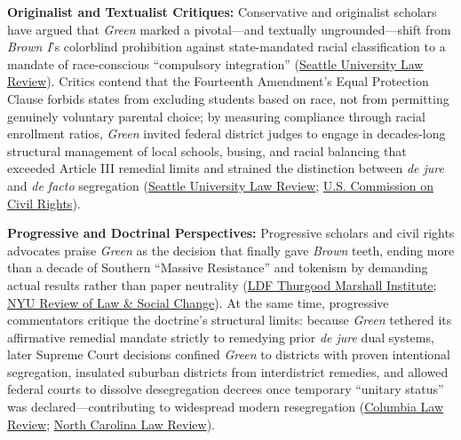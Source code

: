 \documentclass[12pt]{article}
\begin{document}
\textbf{Originalist and Textualist Critiques:} Conservative and originalist scholars have argued that \textit{Green} marked a pivotal---and textually ungrounded---shift from \textit{Brown I}'s colorblind prohibition against state-mandated racial classification to a mandate of race-conscious ``compulsory integration'' (\href{https://digitalcommons.law.seattleu.edu/cgi/viewcontent.cgi?article=1840&context=sulr}{Seattle University Law Review}). Critics contend that the Fourteenth Amendment's Equal Protection Clause forbids states from excluding students based on race, not from permitting genuinely voluntary parental choice; by measuring compliance through racial enrollment ratios, \textit{Green} invited federal district judges to engage in decades-long structural management of local schools, busing, and racial balancing that exceeded Article III remedial limits and strained the distinction between \textit{de jure} and \textit{de facto} segregation (\href{https://digitalcommons.law.seattleu.edu/cgi/viewcontent.cgi?article=1840&context=sulr}{Seattle University Law Review}; \href{https://www.usccr.gov/files/historical/2006/06-006.pdf}{U.S. Commission on Civil Rights}).

\textbf{Progressive and Doctrinal Perspectives:} Progressive scholars and civil rights advocates praise \textit{Green} as the decision that finally gave \textit{Brown} teeth, ending more than a decade of Southern ``Massive Resistance'' and tokenism by demanding actual results rather than paper neutrality (\href{https://tminstituteldf.org/renewing-the-promise-of-brown/}{LDF Thurgood Marshall Institute}; \href{https://socialchangenyu.com/harbinger/whatever-happened-to-the-green-factors-affirmative-action-through-the-lens-of-desegregation-law/}{NYU Review of Law \& Social Change}). At the same time, progressive commentators critique the doctrine's structural limits: because \textit{Green} tethered its affirmative remedial mandate strictly to remedying prior \textit{de jure} dual systems, later Supreme Court decisions confined \textit{Green} to districts with proven intentional segregation, insulated suburban districts from interdistrict remedies, and allowed federal courts to dissolve desegregation decrees once temporary ``unitary status'' was declared---contributing to widespread modern resegregation (\href{https://columbialawreview.org/content/the-contested-role-of-time-in-equal-protection/}{Columbia Law Review}; \href{https://scholarship.law.unc.edu/cgi/viewcontent.cgi?article=3435&context=nclr}{North Carolina Law Review}).
\end{document}
